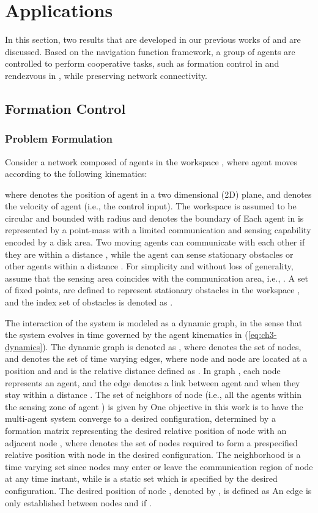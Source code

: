 \documentclass[english]{IOS-Book-Article}
\theoremstyle{definition}
\theoremstyle{definition}
\begin{document}
\section{Applications}

In this section, two results that are developed in our previous works
of \cite{Kan.Dani.ea2012} and \cite{Kan2012submitted} are discussed.
Based on the navigation function framework, a group of agents are
controlled to perform cooperative tasks, such as formation control
in \cite{Kan.Dani.ea2012} and rendezvous in \cite{Kan2012submitted},
while preserving network connectivity.


\subsection{Formation Control}


\subsubsection{Problem Formulation}

Consider a network composed of  agents in the workspace ,
where agent  moves according to the following kinematics:

where  denotes the position of agent 
in a two dimensional (2D) plane, and  denotes
the velocity of agent  (i.e., the control input). The workspace
 is assumed to be circular and bounded with radius 
and  denotes the boundary of 
Each agent in  is represented by a point-mass with a
limited communication and sensing capability encoded by a disk area.
Two moving agents can communicate with each other if they are within
a distance , while the agent can sense stationary obstacles
or other agents within a distance . For simplicity and without
loss of generality, assume that the sensing area coincides with the
communication area, i.e., . A set of fixed points, 
are defined to represent  stationary obstacles in the workspace
, and the index set of obstacles is denoted as . 

The interaction of the system is modeled as a dynamic graph, in the
sense that the system evolves in time governed by the agent kinematics
in (\ref{eq:ch3-dynamics}). The dynamic graph is denoted as ,
where  denotes the set of
nodes, and 
denotes the set of time varying edges, where node  and node 
are located at a position  and  and 
is the relative distance defined as .
In graph , each node  represents an agent, and
the edge  denotes a link between agent
 and  when they stay within a distance . The set of
neighbors of node  (i.e., all the agents within the sensing zone
of agent ) is given by 
One objective in this work is to have the multi-agent system converge
to a desired configuration, determined by a formation matrix 
representing the desired relative position of node  with an adjacent
node , where 
denotes the set of nodes required to form a prespecified relative
position with node  in the desired configuration. The neighborhood
 is a time varying set since nodes may enter or
leave the communication region of node  at any time instant, while
 is a static set which is specified by the desired
configuration. The desired position of node , denoted by ,
is defined as 
An edge  is only established between nodes  and
 if .
\end{document}
